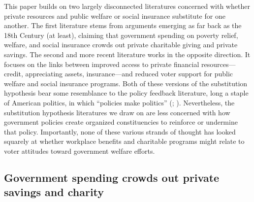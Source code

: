 \documentclass[
  11pt,
  oneside]{article}
\begin{document}
This paper builds on two largely disconnected literatures concerned with whether private resources and public welfare or social insurance substitute for one another. The first literature stems from arguments emerging as far back as the 18th Century (at least), claiming that government spending on poverty relief, welfare, and social insurance crowds out private charitable giving and private savings. The second and more recent literature works in the opposite direction. It focuses on the links between improved access to private financial resources---credit, appreciating assets, insurance---and reduced voter support for public welfare and social insurance programs. Both of these versions of the substitution hypothesis bear some resemblance to the policy feedback literature, long a staple of American politics, in which ``policies make politics'' (; ). Nevertheless, the substitution hypothesis literatures we draw on are less concerned with how government policies create organized constituencies to reinforce or undermine that policy. Importantly, none of these various strands of thought has looked squarely at whether workplace benefits and charitable programs might relate to voter attitudes toward government welfare efforts.

\subsection{Government spending crowds out private savings and charity}\label{government-spending-crowds-out-private-savings-and-charity}
\end{document}
